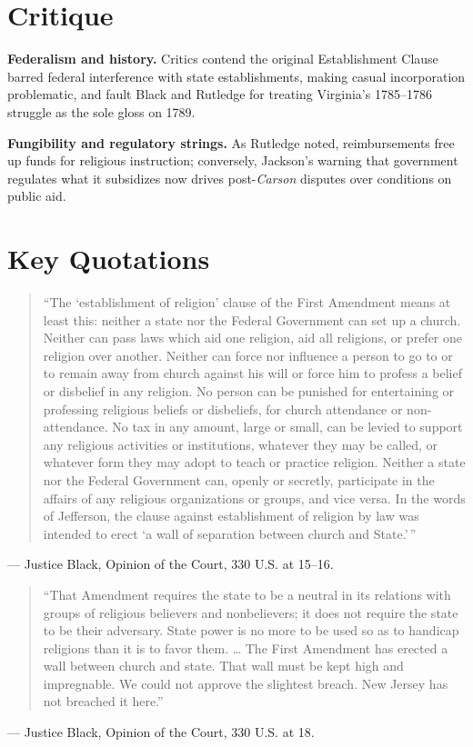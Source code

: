 \documentclass[12pt]{article}
\begin{document}
\section{Critique}

\textbf{Federalism and history.} Critics contend the original Establishment Clause barred federal interference with state establishments, making casual incorporation problematic, and fault Black and Rutledge for treating Virginia's 1785--1786 struggle as the sole gloss on 1789.

\textbf{Fungibility and regulatory strings.} As Rutledge noted, reimbursements free up funds for religious instruction; conversely, Jackson's warning that government regulates what it subsidizes now drives post-\textit{Carson} disputes over conditions on public aid.

\section{Key Quotations}

\begin{quote}
``The `establishment of religion' clause of the First Amendment means at least this: neither a state nor the Federal Government can set up a church. Neither can pass laws which aid one religion, aid all religions, or prefer one religion over another. Neither can force nor influence a person to go to or to remain away from church against his will or force him to profess a belief or disbelief in any religion. No person can be punished for entertaining or professing religious beliefs or disbeliefs, for church attendance or non-attendance. No tax in any amount, large or small, can be levied to support any religious activities or institutions, whatever they may be called, or whatever form they may adopt to teach or practice religion. Neither a state nor the Federal Government can, openly or secretly, participate in the affairs of any religious organizations or groups, and vice versa. In the words of Jefferson, the clause against establishment of religion by law was intended to erect `a wall of separation between church and State.'\,''
\end{quote}
\noindent --- Justice Black, Opinion of the Court, 330 U.S. at 15--16.

\begin{quote}
``That Amendment requires the state to be a neutral in its relations with groups of religious believers and nonbelievers; it does not require the state to be their adversary. State power is no more to be used so as to handicap religions than it is to favor them. \ldots{} The First Amendment has erected a wall between church and state. That wall must be kept high and impregnable. We could not approve the slightest breach. New Jersey has not breached it here.''
\end{quote}
\noindent --- Justice Black, Opinion of the Court, 330 U.S. at 18.
\end{document}
